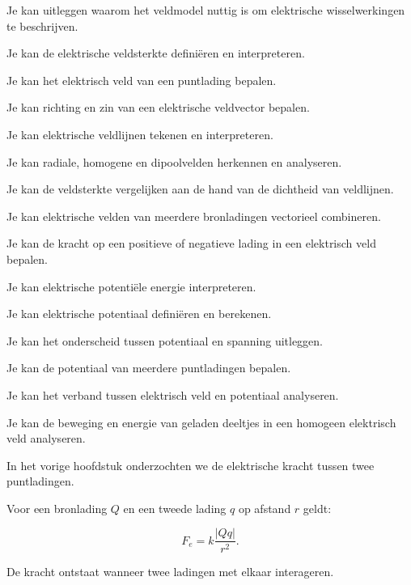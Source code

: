 \documentclass{ximera}
\begin{document}
\begin{leerdoelen}
  \item Je kan uitleggen waarom het veldmodel nuttig is om
        elektrische wisselwerkingen te beschrijven.
  \item Je kan de elektrische veldsterkte definiëren en interpreteren.
  \item Je kan het elektrisch veld van een puntlading bepalen.
  \item Je kan richting en zin van een elektrische veldvector bepalen.
  \item Je kan elektrische veldlijnen tekenen en interpreteren.
  \item Je kan radiale, homogene en dipoolvelden herkennen en
        analyseren.
  \item Je kan de veldsterkte vergelijken aan de hand van de dichtheid
        van veldlijnen.
  \item Je kan elektrische velden van meerdere bronladingen vectorieel
        combineren.
  \item Je kan de kracht op een positieve of negatieve lading in een
        elektrisch veld bepalen.
  \item Je kan elektrische potentiële energie interpreteren.
  \item Je kan elektrische potentiaal definiëren en berekenen.
  \item Je kan het onderscheid tussen potentiaal en spanning uitleggen.
  \item Je kan de potentiaal van meerdere puntladingen bepalen.
  \item Je kan het verband tussen elektrisch veld en potentiaal
        analyseren.
  \item Je kan de beweging en energie van geladen deeltjes in een
        homogeen elektrisch veld analyseren.
\end{leerdoelen}




In het vorige hoofdstuk onderzochten we de elektrische kracht tussen
twee puntladingen.

Voor een bronlading $Q$ en een tweede lading $q$ op afstand $r$ geldt:

\[
F_e
=
k\frac{|Qq|}{r^2}.
\]

De kracht ontstaat wanneer twee ladingen met elkaar interageren.
\end{document}
